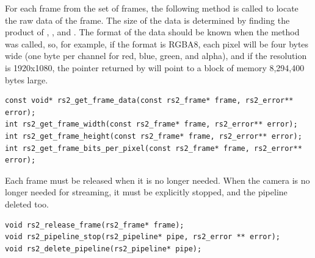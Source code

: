     For each frame from the set of frames, the following method is called to locate the raw data of the frame. The size of the data is determined by finding the product of , , and . The format of the data should be known when the  method was called, so, for example, if the format is RGBA8, each pixel will be four bytes wide (one byte per channel for red, blue, green, and alpha), and if the resolution is 1920x1080, the pointer returned by  will point to a block of memory 8,294,400 bytes large.

    \begin{lstlisting}[style=CStyle]
const void* rs2_get_frame_data(const rs2_frame* frame, rs2_error** error);
int rs2_get_frame_width(const rs2_frame* frame, rs2_error** error);
int rs2_get_frame_height(const rs2_frame* frame, rs2_error** error);
int rs2_get_frame_bits_per_pixel(const rs2_frame* frame, rs2_error** error);\end{lstlisting}

    Each frame must be released when it is no longer needed. When the camera is no longer needed for streaming, it must be explicitly stopped, and the pipeline deleted too.
    \begin{lstlisting}[style=CStyle]
void rs2_release_frame(rs2_frame* frame);
void rs2_pipeline_stop(rs2_pipeline* pipe, rs2_error ** error);
void rs2_delete_pipeline(rs2_pipeline* pipe);\end{lstlisting}


